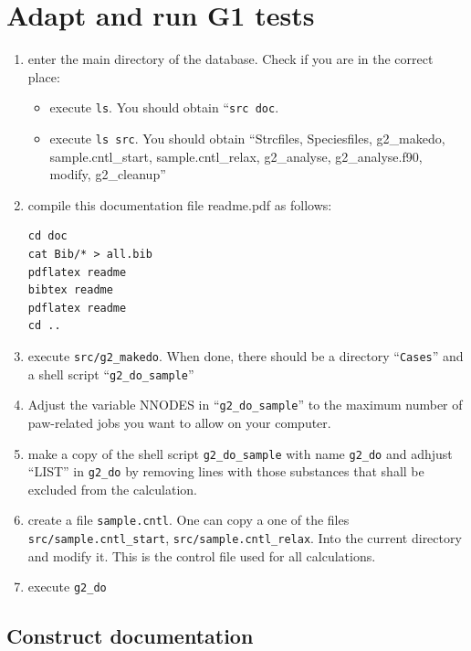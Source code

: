 \documentclass{book}
\begin{document}
\section*{Adapt and run G1 tests}
\begin{enumerate}
\item enter the main directory of the database. Check if you are in
  the correct place:
  \begin{itemize} 
    \item execute \verb|ls|. You should obtain ``\verb|src doc|. 
    \item execute \verb|ls src|. You should obtain ``Strcfiles,
      Speciesfiles, g2\_makedo, sample.cntl\_start,
      sample.cntl\_relax, g2\_analyse, g2\_analyse.f90, modify, g2\_cleanup''
   \end{itemize}
%
\item compile this documentation file readme.pdf as follows:
\begin{verbatim}
cd doc
cat Bib/* > all.bib
pdflatex readme
bibtex readme
pdflatex readme
cd ..
\end{verbatim}
%
\item execute \verb|src/g2_makedo|. When done, there should be a
  directory ``\verb|Cases|'' and a shell script ``\verb|g2_do_sample|''
%
\item Adjust the variable NNODES in ``\verb|g2_do_sample|'' to the
  maximum number of paw-related jobs you want to allow on your
  computer.
%
\item make a copy of the shell script \verb|g2_do_sample| with name
  \verb|g2_do| and adhjust ``LIST'' in \verb|g2_do| by removing lines
  with those substances that shall be excluded from the calculation.
%
\item create a file \verb|sample.cntl|. One can copy a one of the
  files \verb|src/sample.cntl_start|,
  \verb|src/sample.cntl_relax|. Into the current directory and modify
  it. This is the control file used for all calculations.
%
\item execute \verb|g2_do|
%
\end{enumerate}

\subsection*{Construct documentation}
\end{document}
